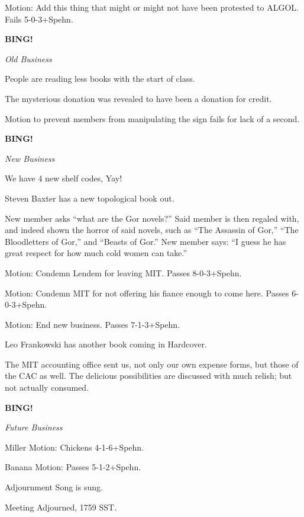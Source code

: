 \documentclass{article}
\begin{document}
Motion: Add this thing that might or might not have been protested to ALGOL.  Fails 5-0-3+Spehn.

\textbf{BING!}

\begin{center}
\textit{Old Business}
\end{center}

People are reading less books with the start of class.

The mysterious donation was revealed to have been a donation for credit.

Motion to prevent members from manipulating the sign fails for lack of a second.

\textbf{BING!}

\begin{center}
\textit{New Business}
\end{center}

We have 4 new shelf codes, Yay!

Steven Baxter has a new topological book out.

New member asks ``what are the Gor novels?''  Said member is then regaled with, and indeed shown the horror of said novels, such as ``The Assassin of Gor,'' ``The Bloodletters of Gor,'' and ``Beasts of Gor.''  New member says: ``I guess he has great respect for how much cold women can take.''

Motion: Condemn Lendem for leaving MIT.  Passes 8-0-3+Spehn.

Motion: Condemn MIT for not offering his fiance enough to come here.  Passes 6-0-3+Spehn.

Motion:  End new business.  Passes 7-1-3+Spehn.

Leo Frankowski has another book coming in Hardcover.

The MIT accounting office sent us, not only our own expense forms, but those of the CAC as well.  The delicious possibilities are discussed with much relish; but not actually consumed.

\textbf{BING!}

\begin{center}
\textit {Future Business}
\end{center}

Miller Motion:  Chickens 4-1-6+Spehn.

Banana Motion: Passes 5-1-2+Spehn.

Adjournment Song is sung.



Meeting Adjourned, 1759 SST.
\end{document}
